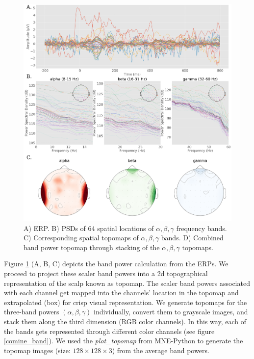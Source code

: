 \documentclass{article}
\begin{document}
\begin{figure}[ht]
\vskip 0.2in
\begin{center}
\centerline{\includegraphics[width=\columnwidth]{Images/topomap_gen}}
\caption[Spatial-spectral topomap generation process]{A) ERP. B) PSDs of 64 spatial locations of $\alpha, \beta, \gamma$ frequency bands. C) Corresponding spatial topomaps of $\alpha, \beta, \gamma$ bands. D) Combined band power topomap through stacking of the $\alpha, \beta, \gamma$ topomaps.}
\label{topomap_gen}
\end{center}
\vskip -0.2in
\end{figure}

Figure \ref{topomap_gen} (A, B, C) depicts the band power calculation from the ERPs. We proceed to project these scaler band powers into a 2d topographical representation of the scalp known as topomap. The scaler band powers associated with each channel get mapped into the channels' location in the topomap and extrapolated (box) for crisp visual representation. We generate topomaps for the three-band powers $(\alpha, \beta, \gamma)$ individually, convert them to grayscale images, and stack them along the third dimension (RGB color channels). In this way, each of the bands gets represented through different color channels (see figure \ref{comine_band}). We used the \emph{plot\_topomap} from MNE-Python to generate the topomap images (size: $128 \times 128 \times 3$) from the average band powers.
\end{document}
